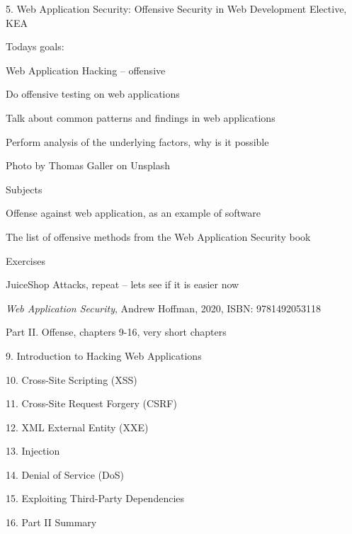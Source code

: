 \documentclass[Screen16to9,17pt]{foils}
\begin{document}
\mytitlepage
{5. Web Application Security: Offensive}
{Security in Web Development Elective, KEA}




Todays goals:
\begin{list2}
\item Web Application Hacking -- offensive
\item Do offensive testing on web applications
\item Talk about common patterns and findings in web applications
\item Perform analysis of the underlying factors, why is it possible
\end{list2}

Photo by Thomas Galler on Unsplash




\begin{list1}
\item Subjects
\begin{list2}
\item Offense against web application, as an example of software
\item The list of offensive methods from the Web Application Security book
\end{list2}
\item Exercises
\begin{list2}
\item JuiceShop Attacks, repeat -- lets see if it is easier now
\end{list2}
\end{list1}


\emph{Web Application Security}, Andrew Hoffman, 2020, ISBN: 9781492053118

\begin{list1}
\item Part II. Offense, chapters 9-16, very short chapters
\item 9. Introduction to Hacking Web Applications
\item 10. Cross-Site Scripting (XSS)
\item 11. Cross-Site Request Forgery (CSRF)
\item 12. XML External Entity (XXE)
\item 13. Injection
\item 14. Denial of Service (DoS)
\item 15. Exploiting Third-Party Dependencies
\item 16. Part II Summary
\end{list1}
\end{document}
